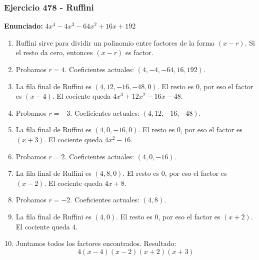 \documentclass[11pt,a4paper]{article}
\begin{document}
\subsubsection*{Ejercicio 478 - Ruffini}
\textbf{Enunciado:} $ 4 x^{4} - 4 x^{3} - 64 x^{2} + 16 x + 192 $\par
\begin{enumerate}[leftmargin=2em]
\item Ruffini sirve para dividir un polinomio entre factores de la forma \((x-r)\). Si el resto da cero, entonces \((x-r)\) es factor.
\item Probamos \(r=4\). Coeficientes actuales: \((4, -4, -64, 16, 192)\).
\item La fila final de Ruffini es \((4, 12, -16, -48, 0)\). El resto es \(0\), por eso el factor es \((x-4)\). El cociente queda \(4 x^{3} + 12 x^{2} - 16 x - 48\).
\item Probamos \(r=-3\). Coeficientes actuales: \((4, 12, -16, -48)\).
\item La fila final de Ruffini es \((4, 0, -16, 0)\). El resto es \(0\), por eso el factor es \((x+3)\). El cociente queda \(4 x^{2} - 16\).
\item Probamos \(r=2\). Coeficientes actuales: \((4, 0, -16)\).
\item La fila final de Ruffini es \((4, 8, 0)\). El resto es \(0\), por eso el factor es \((x-2)\). El cociente queda \(4 x + 8\).
\item Probamos \(r=-2\). Coeficientes actuales: \((4, 8)\).
\item La fila final de Ruffini es \((4, 0)\). El resto es \(0\), por eso el factor es \((x+2)\). El cociente queda \(4\).
\item Juntamos todos los factores encontrados. Resultado: \[\boxed{4 \left(x - 4\right) \left(x - 2\right) \left(x + 2\right) \left(x + 3\right)}\]
\end{enumerate}

\vspace{0.2cm}
\end{document}
